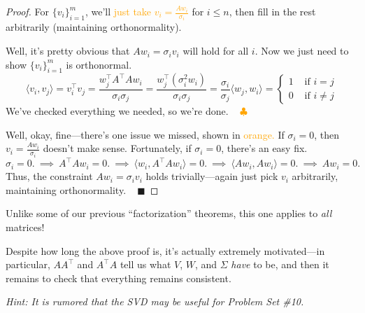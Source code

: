 \begin{proof}
    For $\{v_i\}_{i = 1}^m$, we'll \textcolor{orange}{just take $v_i = \frac{Aw_i}{\sigma_i}$} for $i \leq n$, then fill in the rest arbitrarily (maintaining orthonormality).

    Well, it's pretty obvious that $Aw_i = \sigma_i v_i$ will hold for all $i$.  Now we just need to show $\{v_i\}_{i = 1}^m$ is orthonormal.
    \[ \langle v_i, v_j \rangle = v_i^{\top}v_j = \frac{w_j^{\top}A^{\top}Aw_i}{\sigma_i \sigma_j} = \frac{w_j^{\top}(\sigma_i^2 w_i)}{\sigma_i \sigma_j} = \frac{\sigma_i}{\sigma_j}\langle w_j, w_i \rangle = \begin{cases} 1 & \text{ if } i = j \\ 0 & \text{ if } i \neq j \end{cases} \]
    We've checked everything we needed, so we're done. ~ \textcolor{orange}{$\clubsuit$}

   Well, okay, fine---there's one issue we missed, shown in \textcolor{orange}{orange.}  If $\sigma_i = 0$, then $v_i = \frac{Aw_i}{\sigma_i}$ doesn't make sense.  Fortunately, if $\sigma_i = 0$, there's an easy fix.
   \[ \sigma_i = 0 . ~ \implies ~ A^{\top}Aw_i = 0. ~ \implies ~ \langle w_i, A^{\top}Aw_i \rangle = 0. ~ \implies ~ \langle Aw_i, Aw_i \rangle = 0. ~ \implies ~ Aw_i = 0. \]
   Thus, the constraint $Aw_i = \sigma_i v_i$ holds trivially---again just pick $v_i$ arbitrarily, maintaining orthonormality. ~ $\blacksquare$
\end{proof}

Unlike some of our previous ``factorization'' theorems, this one applies to \emph{all} matrices!

\begin{remark}
    Despite how long the above proof is, it's actually extremely motivated---in particular, $AA^{\top}$ and $A^{\top}A$ tell us what $V$, $W$, and $\Sigma$ \emph{have} to be, and then it remains to check that everything remains consistent.
\end{remark}

\emph{Hint: It is rumored that the SVD may be useful for Problem Set \#10.}



